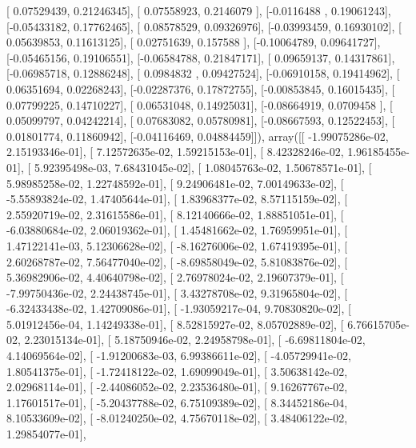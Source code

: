 \documentclass{article}
\begin{document}
       [ 0.07529439,  0.21246345],
       [ 0.07558923,  0.2146079 ],
       [-0.0116488 ,  0.19061243],
       [-0.05433182,  0.17762465],
       [ 0.08578529,  0.09326976],
       [-0.03993459,  0.16930102],
       [ 0.05639853,  0.11613125],
       [ 0.02751639,  0.157588  ],
       [-0.10064789,  0.09641727],
       [-0.05465156,  0.19106551],
       [-0.06584788,  0.21847171],
       [ 0.09659137,  0.14317861],
       [-0.06985718,  0.12886248],
       [ 0.0984832 ,  0.09427524],
       [-0.06910158,  0.19414962],
       [ 0.06351694,  0.02268243],
       [-0.02287376,  0.17872755],
       [-0.00853845,  0.16015435],
       [ 0.07799225,  0.14710227],
       [ 0.06531048,  0.14925031],
       [-0.08664919,  0.0709458 ],
       [ 0.05099797,  0.04242214],
       [ 0.07683082,  0.05780981],
       [-0.08667593,  0.12522453],
       [ 0.01801774,  0.11860942],
       [-0.04116469,  0.04884459]]), array([[ -1.99075286e-02,   2.15193346e-01],
       [  7.12572635e-02,   1.59215153e-01],
       [  8.42328246e-02,   1.96185455e-01],
       [  5.92395498e-03,   7.68431045e-02],
       [  1.08045763e-02,   1.50678571e-01],
       [  5.98985258e-02,   1.22748592e-01],
       [  9.24906481e-02,   7.00149633e-02],
       [ -5.55893824e-02,   1.47405644e-01],
       [  1.83968377e-02,   8.57115159e-02],
       [  2.55920719e-02,   2.31615586e-01],
       [  8.12140666e-02,   1.88851051e-01],
       [ -6.03880684e-02,   2.06019362e-01],
       [  1.45481662e-02,   1.76959951e-01],
       [  1.47122141e-03,   5.12306628e-02],
       [ -8.16276006e-02,   1.67419395e-01],
       [  2.60268787e-02,   7.56477040e-02],
       [ -8.69858049e-02,   5.81083876e-02],
       [  5.36982906e-02,   4.40640798e-02],
       [  2.76978024e-02,   2.19607379e-01],
       [ -7.99750436e-02,   2.24438745e-01],
       [  3.43278708e-02,   9.31965804e-02],
       [ -6.32433438e-02,   1.42709086e-01],
       [ -1.93059217e-04,   9.70830820e-02],
       [  5.01912456e-04,   1.14249338e-01],
       [  8.52815927e-02,   8.05702889e-02],
       [  6.76615705e-02,   2.23015134e-01],
       [  5.18750946e-02,   2.24958798e-01],
       [ -6.69811804e-02,   4.14069564e-02],
       [ -1.91200683e-03,   6.99386611e-02],
       [ -4.05729941e-02,   1.80541375e-01],
       [ -1.72418122e-02,   1.69099049e-01],
       [  3.50638142e-02,   2.02968114e-01],
       [ -2.44086052e-02,   2.23536480e-01],
       [  9.16267767e-02,   1.17601517e-01],
       [ -5.20437788e-02,   6.75109389e-02],
       [  8.34452186e-04,   8.10533609e-02],
       [ -8.01240250e-02,   4.75670118e-02],
       [  3.48406122e-02,   1.29854077e-01],
\end{document}
